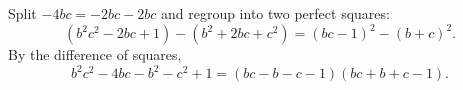 Split $-4bc=-2bc-2bc$ and regroup into two perfect squares:
\[
(b^2c^2-2bc+1)-(b^2+2bc+c^2)=(bc-1)^2-(b+c)^2 .
\]
By the difference of squares,
\[
b^2c^2-4bc-b^2-c^2+1=\boxed{(bc-b-c-1)(bc+b+c-1)}.
\]
